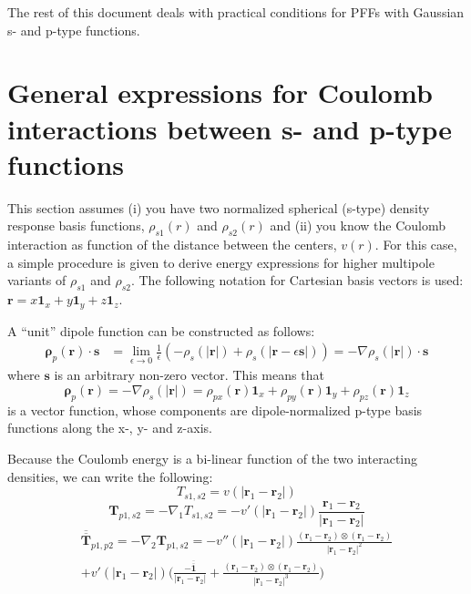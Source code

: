 \documentclass[a4paper,12pt,parskip=half]{scrartcl}
\newcommand*{\tensor}[1]{\overline{\overline{\mathbold{#1}}}}
\begin{document}
The rest of this document deals with practical conditions for PFFs with Gaussian s- and p-type functions.


\section{General expressions for Coulomb interactions between s- and p-type functions}

This section assumes (i) you have two normalized spherical (s-type) density response basis functions, $\rho_{s1}(r)$ and $\rho_{s2}(r)$ and (ii) you know the Coulomb interaction as function of the distance between the centers, $v(r)$. For this case, a simple procedure is given to derive energy expressions for higher multipole variants of $\rho_{s1}$ and $\rho_{s2}$. The following notation for Cartesian basis vectors is used: $\mathbold{r} = x \mathbold{1}_x + y \mathbold{1}_y + z \mathbold{1}_z$.

A ``unit'' dipole function can be constructed as follows:
%
\begin{align}
    \mathbold{\rho}_p(\mathbold{r}) \cdot \mathbold{s}
        & = \lim_{\epsilon \rightarrow 0} \frac{1}{\epsilon} \left( -\rho_s(|\mathbold{r}|) + \rho_s(|\mathbold{r} - \epsilon \mathbold{s}|) \right) = -\nabla \rho_s(|\mathbold{r}|) \cdot \mathbold{s}
\end{align}
%
where $\mathbold{s}$ is an arbitrary non-zero vector. This means that
%
\begin{equation}
    \mathbold{\rho}_p(\mathbold{r}) = -\nabla \rho_s(|\mathbold{r}|) = \rho_{px}(\mathbold{r}) \mathbold{1}_x + \rho_{py}(\mathbold{r}) \mathbold{1}_y + \rho_{pz}(\mathbold{r}) \mathbold{1}_z
\end{equation}
%
is a vector function, whose components are dipole-normalized p-type basis functions along the x-, y- and z-axis.

Because the Coulomb energy is a bi-linear function of the two interacting densities, we can write the following:
%
\begin{equation}
    \label{eq:ss_general}
    T_{s1,s2} = v(|\mathbold{r}_1 - \mathbold{r}_2|)
\end{equation}
\begin{equation}
    \mathbold{T}_{p1,s2} = -\nabla_1 T_{s1,s2} = -v'(|\mathbold{r}_1 - \mathbold{r}_2|) \frac{\mathbold{r}_1 - \mathbold{r}_2}{|\mathbold{r}_1 - \mathbold{r}_2|}
\end{equation}
\begin{equation}
\begin{split}
    \label{eq:pp_general}
    \tensor{T}_{p1,p2} = -\nabla_2 \mathbold{T}_{p1,s2} =
 -v''(|\mathbold{r}_1 - \mathbold{r}_2|) \frac{(\mathbold{r}_1 - \mathbold{r}_2) \otimes (\mathbold{r}_1 - \mathbold{r}_2)}{|\mathbold{r}_1 - \mathbold{r}_2|^2} \\
       +v'(|\mathbold{r}_1 - \mathbold{r}_2|) \Biggl( \frac{-\tensor{1}}{|\mathbold{r}_1 - \mathbold{r}_2|}
            + \frac{(\mathbold{r}_1 - \mathbold{r}_2) \otimes (\mathbold{r}_1 - \mathbold{r}_2)}{|\mathbold{r}_1 - \mathbold{r}_2|^3}
            \Biggr)
\end{split}
\end{equation}
\end{document}
